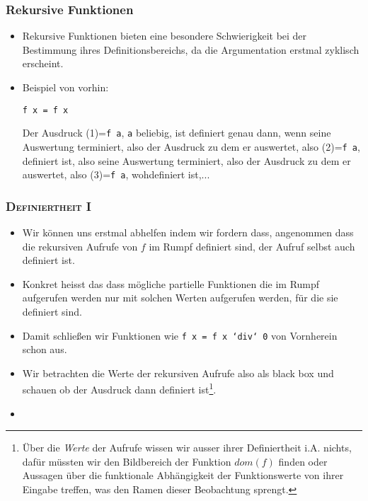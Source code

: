 \documentclass{beamer}
\begin{document}
\begin{frame}[fragile]
  \frametitle{Rekursive Funktionen}
  \begin{itemize}
  \item Rekursive Funktionen bieten eine besondere Schwierigkeit bei der Bestimmung ihres Definitionsbereichs, da die Argumentation erstmal zyklisch erscheint. 
  \item Beispiel von vorhin:
\begin{Verbatim}
f x = f x
\end{Verbatim}
    Der Ausdruck (1)=\texttt{f a}, \texttt{a} beliebig, ist definiert genau dann, wenn seine Auswertung terminiert, also der Ausdruck zu dem er auswertet, also (2)=\texttt{f a}, definiert ist, also seine Auswertung terminiert, also der Ausdruck zu dem er auswertet, also (3)=\texttt{f a}, wohdefiniert ist,...
  \end{itemize}
\end{frame}
\begin{frame}
  \frametitle{\textsc{Definiertheit I}}
  \begin{itemize}
  \item Wir können uns erstmal abhelfen indem wir fordern dass, angenommen dass die rekursiven Aufrufe von \(f\) im Rumpf definiert sind, der Aufruf selbst auch definiert ist.
  \item Konkret heisst das dass mögliche partielle Funktionen die im Rumpf aufgerufen werden nur mit solchen Werten aufgerufen werden, für die sie definiert sind.
  \item Damit schließen wir Funktionen wie \texttt{f x = f x `div` 0} von Vornherein schon aus.
  \item Wir betrachten die Werte der rekursiven Aufrufe also als black box und schauen ob der Ausdruck dann definiert ist\footnote{Über die \emph{Werte} der Aufrufe wissen wir ausser ihrer Definiertheit i.A. nichts, dafür müssten wir den Bildbereich der Funktion \(dom(f)\) finden oder Aussagen über die funktionale Abhängigkeit der Funktionswerte von ihrer Eingabe treffen, was den Ramen dieser Beobachtung sprengt.}.
  \item {}
  \end{itemize}
\end{frame}
\end{document}
